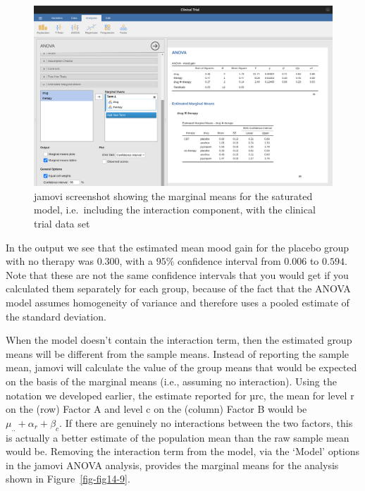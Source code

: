 \documentclass[
  a4paper,
]{book}
\begin{document}
\begin{figure}

\includegraphics[width=1\textwidth,height=\textheight]{images/fig14-8.png} \hfill{}

\caption{\label{fig-fig14-8}jamovi screenshot showing the marginal means
for the saturated model, i.e.~including the interaction component, with
the clinical trial data set}

\end{figure}

In the output we see that the estimated mean mood gain for the placebo
group with no therapy was \(0.300\), with a \(95\%\) confidence interval
from \(0.006\) to \(0.594\). Note that these are not the same confidence
intervals that you would get if you calculated them separately for each
group, because of the fact that the ANOVA model assumes homogeneity of
variance and therefore uses a pooled estimate of the standard deviation.

When the model doesn't contain the interaction term, then the estimated
group means will be different from the sample means. Instead of
reporting the sample mean, jamovi will calculate the value of the group
means that would be expected on the basis of the marginal means (i.e.,
assuming no interaction). Using the notation we developed earlier, the
estimate reported for µrc, the mean for level r on the (row) Factor A
and level c on the (column) Factor B would be
\(\mu_{..} + \alpha_r + \beta_c\). If there are genuinely no
interactions between the two factors, this is actually a better estimate
of the population mean than the raw sample mean would be. Removing the
interaction term from the model, via the `Model' options in the jamovi
ANOVA analysis, provides the marginal means for the analysis shown in
Figure~\ref{fig-fig14-9}.
\end{document}
